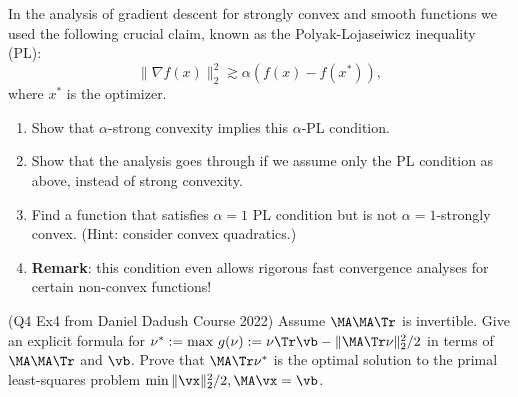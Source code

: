 \documentclass[addpoints,12pt,A4]{exam}
\begin{document}
\begin{questions}
 \question
 In the analysis of gradient descent for strongly convex and smooth functions we used the following crucial claim, known as the Polyak-Lojaseiwicz inequality (PL):
 \[ \|\nabla f(x)\|_{2}^{2} \gtrsim \alpha (f(x) - f(x^{*})) ,    \]
 where $x^{*}$ is the optimizer. 
     \begin{enumerate}
     \item  Show that $\alpha$-strong convexity implies this $\alpha$-PL condition. 
     \item Show that the analysis goes through if we assume only the PL condition as above, instead of strong convexity. 
     \item Find a function that satisfies $\alpha=1$ PL condition but is not $\alpha=1$-strongly convex. (Hint: consider convex quadratics.) 
     \item \textbf{Remark}: this condition even allows rigorous fast convergence analyses for certain non-convex functions!
 \end{enumerate}
 \begin{solution}
 \end{solution}


\question  (Q4 Ex4 from Daniel Dadush Course 2022)
Assume $\MA \MA \Tr$ is invertible. Give an explicit formula for $\nu^* := {\rm max} ~g(\nu) := \nu \Tr \vb - \|\MA \Tr \nu\|_2^2/2$ in terms of $\MA \MA \Tr$ and $\vb$. Prove that $\MA \Tr \nu^*$ is the optimal solution to the primal least-squares problem $\min \|\vx\|_2^2/2, \MA \vx = \vb$.  
\begin{solution}
\end{solution}


\end{questions}
\end{document}
